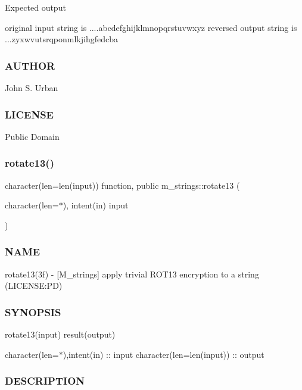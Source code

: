 Expected output \begin{DoxyVerb} original input string is ....abcdefghijklmnopqrstuvwxyz
 reversed output string is ...zyxwvutsrqponmlkjihgfedcba
\end{DoxyVerb}
 \subsubsection*{A\+U\+T\+H\+OR}

John S. Urban \subsubsection*{L\+I\+C\+E\+N\+SE}

Public Domain \mbox{\label{namespacem__strings_af155dcea0c0ccef21bb359040b673014}} 
\subsubsection{\texorpdfstring{rotate13()}{rotate13()}}
{\footnotesize\ttfamily character(len=len(input)) function, public m\+\_\+strings\+::rotate13 (\begin{DoxyParamCaption}\item[{character(len=$\ast$), intent(in)}]{input }\end{DoxyParamCaption})}



\subsubsection*{N\+A\+ME}

rotate13(3f) -\/ \mbox{[}M\+\_\+strings\mbox{]} apply trivial R\+O\+T13 encryption to a string (L\+I\+C\+E\+N\+SE\+:PD) \subsubsection*{S\+Y\+N\+O\+P\+S\+IS}

rotate13(input) result(output)

character(len=$\ast$),intent(in) \+:\+: input character(len=len(input)) \+:\+: output

\subsubsection*{D\+E\+S\+C\+R\+I\+P\+T\+I\+ON}


